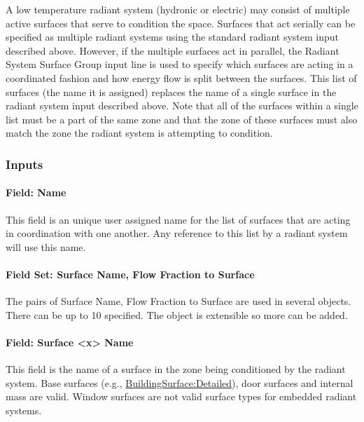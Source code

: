 A low temperature radiant system (hydronic or electric) may consist of multiple active surfaces that serve to condition the space. Surfaces that act serially can be specified as multiple radiant systems using the standard radiant system input described above. However, if the multiple surfaces act in parallel, the Radiant System Surface Group input line is used to specify which surfaces are acting in a coordinated fashion and how energy flow is split between the surfaces. This list of surfaces (the name it is assigned) replaces the name of a single surface in the radiant system input described above. Note that all of the surfaces within a single list must be a part of the same zone and that the zone of these surfaces must also match the zone the radiant system is attempting to condition.

\subsubsection{Inputs}\label{inputs-8-017}

\paragraph{Field: Name}\label{field-name-8-015}

This field is an unique user assigned name for the list of surfaces that are acting in coordination with one another. Any reference to this list by a radiant system will use this name.

\paragraph{Field Set: Surface Name, Flow Fraction to Surface}\label{field-set-surface-name-flow-fraction-to-surface}

The pairs of Surface Name, Flow Fraction to Surface are used in several objects. There can be up to 10 specified. The object is extensible so more can be added.

\paragraph{Field: Surface \textless{}x\textgreater{} Name}\label{field-surface-x-name-2}

This field is the name of a surface in the zone being conditioned by the radiant system. Base surfaces (e.g., \hyperref[buildingsurfacedetailed]{BuildingSurface:Detailed}), door surfaces and internal mass are valid. Window surfaces are not valid surface types for embedded radiant systems.

